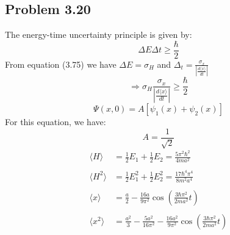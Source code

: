 \documentclass{article}
\begin{document}
\subsection*{Problem 3.20}
The energy-time uncertainty principle is given by:
\[\Delta E \Delta t \geq \frac{\hbar}{2}\]
From equation (3.75) we have \(\Delta E = \sigma_H\)  and \(\Delta_t = \frac{\sigma_x}{\left|\frac{d\langle x \rangle}{dt}\right|}\)
\[\Rightarrow \sigma_H  \frac{\sigma_x}{\left|\frac{d\langle x \rangle}{dt}\right|} \ge \frac{\hbar}{2} \]
\begin{equation*}
	\Psi(x,0) = A[\psi_1(x)+ \psi_2(x)]
\end{equation*}
For this equation, we have:
\[A = \frac{1}{\sqrt{2}}\]
\begin{align*}
	\langle H \rangle               & = \frac{1}{2} E_1 + \frac{1}{2} E_2 = \frac{5 \pi^2 \hbar^2}{4ma^2}                                                                                                                                                                                                                                                                                                                                                                                                           \\ \\
	\langle H^2 \rangle             & = \frac{1}{2} E_1^2 + \frac{1}{2} E_2^2 = \frac{17 \hbar^4 \pi^4}{8 m^2 a^4 }                                                                                                                                                                                                                                                                                                                                                                                                 \\ \\
	\langle x \rangle               & = \frac{a}{2} - \frac{16a}{9 \pi^2 } \cos\left(\frac{3 \hbar \pi^2 }{2 m a ^2 } t\right)                                                                                                                                                                                                                                                                                                                                                                                      \\ \\
	\langle x^2 \rangle             & = \frac{a^2}{3} - \frac{5a^2}{16 \pi^2} - \frac{16a^2}{9 \pi^2} \cos \left(\frac{3 \hbar \pi^2 }{2 m a ^2 } t\right)                                                                                                                                                                                                                                                                                                                                                          \\ \\

\end{align*}
\end{document}
